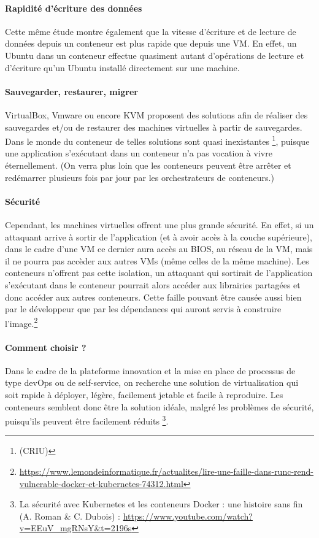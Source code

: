 \documentclass[11pt,fleqn]{book} %
\begin{document}
\paragraph{Rapidité d'écriture des données}
Cette même étude montre également que la vitesse d'écriture et de lecture de données depuis un conteneur est plus rapide que depuis une VM. En effet, un Ubuntu dans un conteneur effectue quasiment autant d'opérations de lecture et d'écriture qu'un Ubuntu installé directement sur une machine.

\paragraph{Sauvegarder, restaurer, migrer}
VirtualBox, Vmware ou encore KVM proposent des solutions afin de réaliser des sauvegardes et/ou de restaurer des machines virtuelles à partir de sauvegardes. Dans le monde du conteneur de telles solutions sont quasi inexistantes \footnote{(CRIU)}, puisque une application s'exécutant dans un conteneur n'a pas vocation à vivre éternellement. (On verra plus loin que les conteneurs peuvent être arrêter et redémarrer plusieurs fois par jour par les orchestrateurs de conteneurs.)

\paragraph{Sécurité}
Cependant, les machines virtuelles offrent une plus grande sécurité. En effet, si un attaquant arrive à sortir de l'application (et à avoir accès à la couche supérieure), dans le cadre d'une VM ce dernier aura accès au BIOS, au réseau de la VM, mais il ne pourra pas accèder aux autres VMs (même celles de la même machine). Les conteneurs n'offrent pas cette isolation, un attaquant qui sortirait de l'application s'exécutant dans le conteneur pourrait alors accéder aux librairies partagées et donc accéder aux autres conteneurs. Cette faille pouvant être causée aussi bien par le développeur que par les dépendances qui auront servis à construire l'image.\footnote{\url{https://www.lemondeinformatique.fr/actualites/lire-une-faille-dans-runc-rend-vulnerable-docker-et-kubernetes-74312.html}} 

\begin{interrupt}
\paragraph{Comment choisir ?}
Dans le cadre de la plateforme innovation et la mise en place de processus de type devOps ou de self-service, on recherche une solution de virtualisation qui soit rapide à  déployer, légère, facilement jetable et facile à reproduire. Les conteneurs semblent donc être la solution idéale, malgré les problèmes de sécurité, puisqu'ils peuvent être facilement réduits \footnote{La sécurité avec Kubernetes et les conteneurs Docker : une histoire sans fin (A. Roman \& C. Dubois) : \url{https://www.youtube.com/watch?v=EEuV_mgRNsY&t=2196s}}. 
\end{interrupt}
\end{document}
